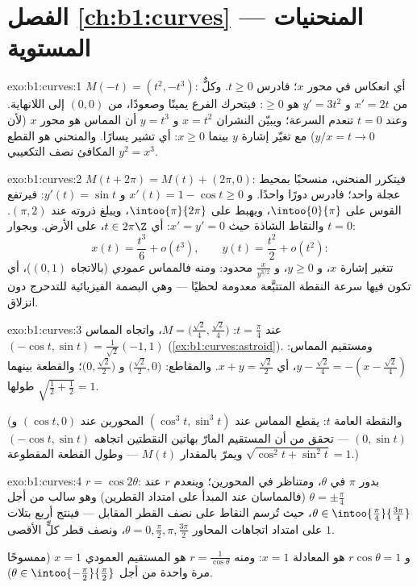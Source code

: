 \section*{الفصل \ref{ch:b1:curves} --- المنحنيات المستوية}

\begin{solution}{exo:b1:curves:1}
$M(-t) = (t^2, -t^3)$: أي انعكاس في محور $x$؛ فادرس $t \geq 0$.
وكلٌّ من $x' = 2t$ و $y' = 3t^2$ هو $\geq 0$: فيتحرك الفرع
يمينًا وصعودًا، من $(0,0)$ إلى اللانهاية. وعند $t = 0$ تنعدم السرعة؛
ويبيّن النشران $x = t^2$ و $y = t^3$ أن المماس هو
محور $x$ (لأن $y/x = t \to 0$) مع تغيّر إشارة $y$ بينما $x \geq 0$:
أي \emph{} تشير يسارًا. والمنحني هو القطع المكافئ نصف
التكعيبي $y^2 = x^3$.
\end{solution}

\begin{solution}{exo:b1:curves:2}
$M(t + 2\pi) = M(t) + (2\pi, 0)$: فيتكرر المنحني، منسحبًا
بمحيط عجلة واحد؛ فادرس دورًا واحدًا. و $x'(t) = 1 - \cos t \geq
0$ و $y'(t) = \sin t$: فيرتفع القوس على $\intoo{0}{\pi}$، ويهبط على
$\intoo{\pi}{2\pi}$، ويبلغ ذروته عند $(\pi, 2)$. والنقاط الشاذة
حيث $x' = y' = 0$: أي $t \in 2\pi\Z$، على الأرض. وبجوار $t = 0$:
\[
x(t) = \frac{t^3}{6} + o(t^3),
\qquad
y(t) = \frac{t^2}{2} + o(t^2):
\]
تتغير إشارة $x$، و $y \geq 0$، و $\frac{x}{y^{3/2}}$ محدود: ومنه فالمماس
\emph{عمودي} (بالاتجاه $(0,1)$)، أي  تكون فيها سرعة النقطة
المتتبَّعة معدومة لحظيًا --- وهي البصمة الفيزيائية
للتدحرج دون انزلاق.
\end{solution}

\begin{solution}{exo:b1:curves:3}
عند $t = \frac\pi4$: $M = \bigl(\frac{\sqrt2}{4},
\frac{\sqrt2}{4}\bigr)$، واتجاه المماس $(-\cos t, \sin t) =
\frac{1}{\sqrt2}(-1, 1)$ (\cref{ex:b1:curves:astroid}). ومستقيم
المماس: $y - \frac{\sqrt2}{4} = -(x - \frac{\sqrt2}{4})$، أي $x +
y = \frac{\sqrt2}{2}$. والمقاطع: $\bigl(\frac{\sqrt2}{2},
0\bigr)$ و $\bigl(0, \frac{\sqrt2}{2}\bigr)$؛ والقطعة بينهما
طولها $\sqrt{\frac12 + \frac12} = 1$.

(والنقطة العامة $t$: يقطع المماس عند $(\cos^3 t, \sin^3 t)$
المحورين عند $(\cos t, 0)$ و $(0, \sin t)$ --- تحقق من أن المستقيم
المارّ بهاتين النقطتين اتجاهه $(-\cos t, \sin t)$ ويمرّ
بالمقدار $M(t)$ --- وطول القطعة المقطوعة $\sqrt{\cos^2 t +
\sin^2 t} = 1$.)
\end{solution}

\begin{solution}{exo:b1:curves:4}
$r = \cos 2\theta$: بدور $\pi$ في $\theta$، ومتناظر في
المحورين؛ وينعدم $r$ عند $\theta = \pm\frac\pi4$ (فالمماسان عند
المبدأ على امتداد القطرين) وهو سالب من أجل $\theta \in
\intoo{\frac\pi4}{\frac{3\pi}{4}}$، حيث تُرسم النقاط على
نصف القطر المقابل --- فينتج أربع بتلات على امتداد اتجاهات المحاور
$\theta = 0, \frac\pi2, \pi, \frac{3\pi}{2}$، ونصف قطر كلٍّ الأقصى
$1$.

و $r\cos\theta = 1$ هو المعادلة $x = 1$: ومنه  $r =
\frac{1}{\cos\theta}$ هو المستقيم العمودي $x = 1$ (ممسوحًا مرة واحدة من أجل
$\theta \in \intoo{-\frac\pi2}{\frac\pi2}$).
\end{solution}

